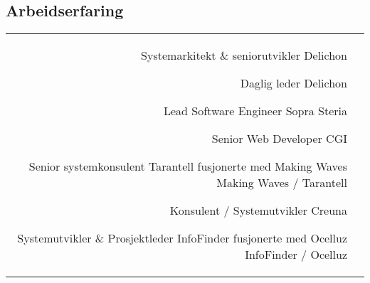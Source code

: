 \documentclass[10pt]{article} %
\begin{document}
\begin{paracol}{2}
\section{Arbeidserfaring} 





\begin{supertabular}{rl} %

	{Systemarkitekt \& seniorutvikler} %
	{} %
	{} %
	{Delichon} %

	{Daglig leder} %
	{} %
	{} %
	{Delichon} %

	{Lead Software Engineer} %
	{} %
	{} %
	{Sopra Steria} %
	
	
	{Senior Web Developer} %
	{} %
	{} %
	{CGI} %
	

	{Senior systemkonsulent} %
	{Tarantell fusjonerte med Making Waves} %
	{} %
	{Making Waves / Tarantell} %
	
	{Konsulent / Systemutvikler} %
	{} %
	{} %
	{Creuna} %
	

	{Systemutvikler \& Prosjektleder} %
	{InfoFinder fusjonerte med Ocelluz} %
	{} %
	{InfoFinder / Ocelluz} %
	

\end{supertabular}
\end{paracol}
\end{document}
